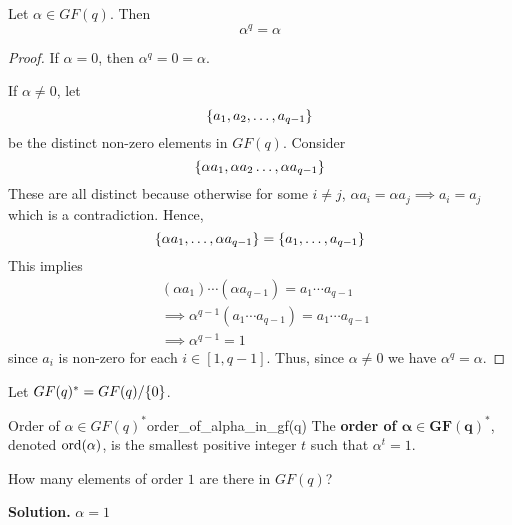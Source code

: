 \begin{Theorem}{}{}
    Let $ \alpha\in GF(q) $. Then
    \[ \alpha^q=\alpha \]
\end{Theorem}

\begin{proof}
    If $ \alpha=0 $, then $ \alpha^q=0=\alpha $.

    If $ \alpha\neq 0 $, let
    \[ \{a_1,a_2,\ldots ,a_{q-1}\} \]
    be the distinct non-zero elements in $ GF(q) $. Consider
    \[ \{\alpha a_1,\alpha a_2\ldots,\alpha a_{q-1}\} \]
    These are all distinct because otherwise for some $ i\neq j $,
    $ \alpha a_i=\alpha a_j\implies a_i=a_j $ which is a contradiction.
    Hence,
    \[ \{\alpha a_1,\ldots ,\alpha a_{q-1}\}=\{a_1,\ldots ,a_{q-1}\} \]
    This implies
    \begin{align*}
         & (\alpha a_1)\cdots (\alpha a_{q-1})=a_1\cdots a_{q-1}      \\
         & \implies \alpha^{q-1}(a_1\cdots a_{q-1})=a_1\cdots a_{q-1} \\
         & \implies \alpha^{q-1}=1
    \end{align*}
    since $ a_i $ is non-zero for each $ i\in[1,q-1] $.
    Thus, since $ \alpha\neq 0 $ we have $ \alpha^q=\alpha $.
\end{proof}

\begin{Definition}{}{}
    Let $ GF(q)^*=GF(q)/\{0\} $.
\end{Definition}

\begin{Definition}{Order of $\alpha\in GF(q)^*$}{order_of_alpha_in_gf(q)}
    The \textbf{order of $\bm{\alpha\in GF(q)^*}$}, denoted
    $ \operatorname{ord}(\alpha) $, is the smallest positive integer $ t $ such that
    $ \alpha^t=1 $.
\end{Definition}

\begin{Example}{}{}
    How many elements of order $ 1 $ are there in $ GF(q) $?

    \textbf{Solution.} $ \alpha=1 $
\end{Example}

